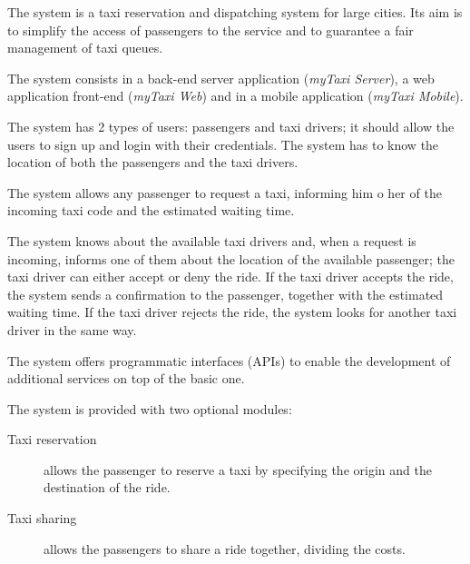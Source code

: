 The system is a taxi reservation and dispatching system for large cities. Its aim is to simplify the access of passengers to the service and to guarantee a fair management of taxi queues.

The system consists in a back-end server application (\emph{myTaxi Server}), a web application front-end (\emph{myTaxi Web}) and in a mobile application (\emph{myTaxi Mobile}).

The system has 2 types of users: passengers and taxi drivers; it should allow the users to sign up and login with their credentials.
The system has to know the location of both the passengers and the taxi drivers.

The system allows any passenger to request a taxi, informing him o her of the incoming taxi code and the estimated waiting time.

The system knows about the available taxi drivers and, when a request is incoming, informs one of them about the location of the available passenger; the taxi driver can either accept or deny the ride.
If the taxi driver accepts the ride, the system sends a confirmation to the passenger, together with the estimated waiting time.
If the taxi driver rejects the ride, the system looks for another taxi driver in the same way.

The system offers programmatic interfaces (APIs) to enable the development of additional services on top of the basic one.

The system is provided with two optional modules:
\begin{description}
\item[Taxi reservation] allows the passenger to reserve a taxi by specifying the origin and the destination of the ride.
\item[Taxi sharing] allows the passengers to share a ride together, dividing the costs.
\end{description}